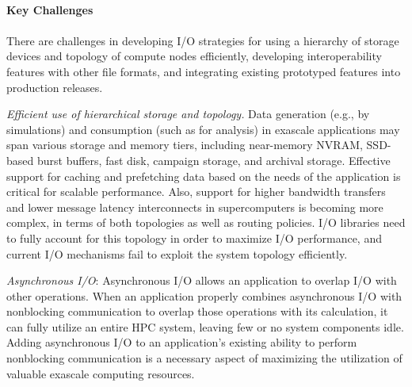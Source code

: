 \paragraph{Key Challenges}
\paragraph{}
There are challenges in developing I/O strategies for using a hierarchy of storage devices and topology of compute nodes efficiently, developing interoperability features with other file formats, and integrating existing prototyped features into production releases. 

\textit{Efficient use of hierarchical storage and topology.} Data generation (e.g., by simulations) and consumption (such as for analysis) in exascale applications may span various storage and memory tiers, including near-memory NVRAM, SSD-based burst buffers, fast disk, campaign storage, and archival storage. Effective support for caching and prefetching data based on the needs of the application is critical for scalable performance. Also, support for higher bandwidth transfers and lower message latency interconnects in supercomputers is becoming more complex, in terms of both topologies as well as routing policies. I/O libraries need to fully account for this topology in order to maximize I/O performance, and current I/O mechanisms fail to exploit the system topology efficiently.


\textit{Asynchronous I/O}: Asynchronous I/O allows an application to overlap I/O with other operations. When an application properly combines asynchronous I/O with nonblocking communication to overlap those operations with its calculation, it can fully utilize an entire HPC system, leaving few or no system components idle.  Adding asynchronous I/O to an application's existing ability to perform nonblocking communication is a necessary aspect of maximizing the utilization of valuable exascale computing resources.

